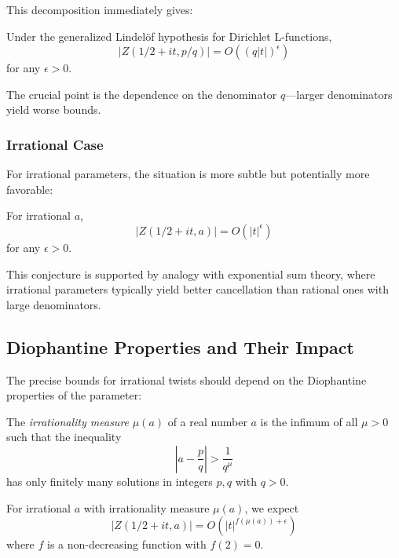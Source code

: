 This decomposition immediately gives:

\begin{corollary}
Under the generalized Lindelöf hypothesis for Dirichlet L-functions,
\begin{equation}
|Z(1/2 + it, p/q)| = O((q|t|)^{\epsilon})
\end{equation}
for any $\epsilon > 0$.
\end{corollary}

The crucial point is the dependence on the denominator $q$---larger denominators yield worse bounds.

\subsubsection{Irrational Case}

For irrational parameters, the situation is more subtle but potentially more favorable:

\begin{conjecture}
For irrational $a$,
\begin{equation}
|Z(1/2 + it, a)| = O(|t|^{\epsilon})
\end{equation}
for any $\epsilon > 0$.
\end{conjecture}

This conjecture is supported by analogy with exponential sum theory, where irrational parameters typically yield better cancellation than rational ones with large denominators.

\subsection{Diophantine Properties and Their Impact}

The precise bounds for irrational twists should depend on the Diophantine properties of the parameter:

\begin{definition}
The \emph{irrationality measure} $\mu(a)$ of a real number $a$ is the infimum of all $\mu > 0$ such that the inequality
\begin{equation}
\left|a - \frac{p}{q}\right| > \frac{1}{q^{\mu}}
\end{equation}
has only finitely many solutions in integers $p, q$ with $q > 0$.
\end{definition}

\begin{conjecture}
For irrational $a$ with irrationality measure $\mu(a)$, we expect
\begin{equation}
|Z(1/2 + it, a)| = O(|t|^{f(\mu(a)) + \epsilon})
\end{equation}
where $f$ is a non-decreasing function with $f(2) = 0$.
\end{conjecture}

